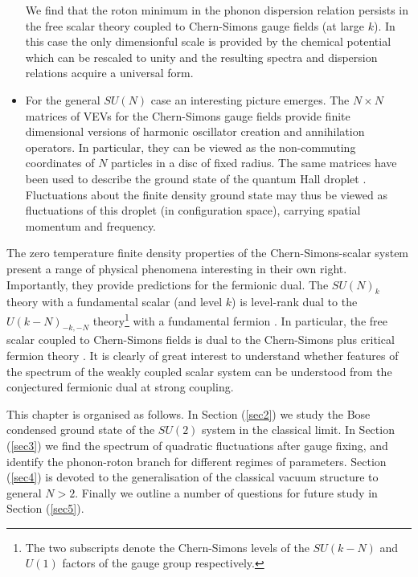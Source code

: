 \begin{itemize}
{ We find that the roton minimum in the phonon dispersion relation persists in the free scalar theory coupled to Chern-Simons gauge fields (at large $k$). In this case the only dimensionful scale is provided by the chemical potential which can be rescaled to unity and the resulting spectra and dispersion relations acquire a universal form.  }
 \item{For the general $SU(N)$ case an interesting picture emerges. The $N\times N$ matrices of VEVs for the Chern-Simons gauge fields provide  finite dimensional versions of harmonic oscillator  creation and annihilation operators. In particular, they can be viewed as the non-commuting coordinates of $N$ particles in a disc of fixed radius. The same matrices have been used to describe the ground state of the quantum Hall droplet \cite{Polychronakos:2001mi, Susskind:2001fb}. Fluctuations about the finite density ground state  may thus be viewed as fluctuations of this droplet (in configuration space), carrying spatial momentum and frequency.}
  \end{itemize}
 The zero temperature finite density properties of the Chern-Simons-scalar system present a range of physical phenomena interesting in their own right. Importantly, they provide predictions for the fermionic dual.  The $SU(N)_k$  theory with a fundamental scalar (and level $k$) is level-rank dual to the $U(k-N)_{-k, -N}$ theory\footnote{The two subscripts denote the Chern-Simons levels of the $SU(k-N)$ and $U(1)$ factors of the gauge group respectively.} with a fundamental fermion \cite{Aharony:2015mjs}. In particular, the free scalar coupled to Chern-Simons fields is dual to the Chern-Simons plus critical fermion theory \cite{Minwalla:2015sca}. It is clearly of great interest to understand whether features of the spectrum of the weakly coupled scalar system can be understood from the conjectured fermionic dual at strong coupling.
 
 This chapter is organised as follows. In Section (\ref{sec2}) we study the Bose condensed ground state of the $SU(2)$ system in the classical limit. In Section (\ref{sec3}) we find the spectrum of quadratic fluctuations after gauge fixing, and identify the phonon-roton branch for different regimes of parameters. Section (\ref{sec4}) is devoted to the generalisation of the classical vacuum structure to general $N>2$.  Finally we outline a number of questions for future study in Section (\ref{sec5}).
 
